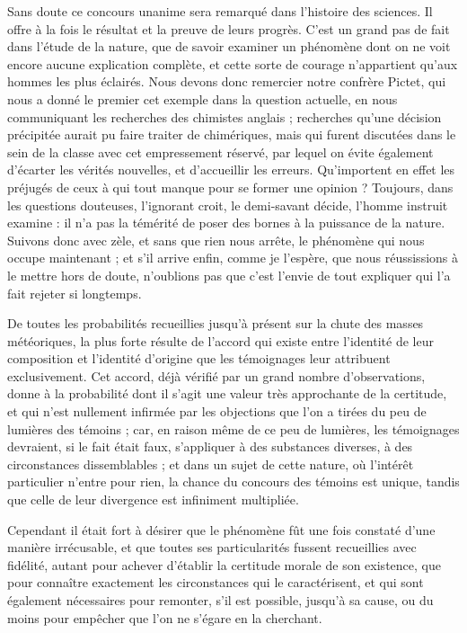 \documentclass[a4paper, 11pt, oneside, polutonikogreek, french]{article}
\begin{document}
Sans doute ce concours unanime sera remarqué dans l'histoire des sciences. Il offre à la fois le résultat et la preuve de leurs progrès. C'est un grand pas de fait dans l'étude de la nature, que de savoir examiner un phénomène dont on ne voit encore aucune explication complète, et cette sorte de courage n'appartient qu'aux hommes les plus éclairés. Nous devons donc remercier notre confrère Pictet, qui nous a donné le premier cet exemple dans la question actuelle, en nous communiquant les recherches des chimistes anglais ; recherches qu'une décision précipitée aurait pu faire traiter de chimériques, mais qui furent discutées dans le sein de la classe avec cet empressement réservé, par lequel on évite également d'écarter les vérités nouvelles, et d'accueillir les erreurs. Qu'importent en effet les préjugés de ceux à qui tout manque pour se former une opinion ? Toujours, dans les questions douteuses, l'ignorant croit, le demi-savant décide, l'homme instruit examine : il n'a pas la témérité de poser des bornes à la puissance de la nature. Suivons donc avec zèle, et sans que rien nous arrête, le phénomène qui nous occupe maintenant ; et s'il arrive enfin, comme je l'espère, que nous réussissions à le mettre hors de doute, n'oublions pas que c'est l'envie de tout expliquer qui l'a fait rejeter si longtemps.

De toutes les probabilités recueillies jusqu'à présent sur la chute des masses météoriques, la plus forte résulte de l'accord qui existe entre l'identité de leur composition et l'identité d'origine que les témoignages leur attribuent exclusivement. Cet accord, déjà vérifié par un grand nombre d'observations, donne à la probabilité dont il s'agit une valeur très approchante de la certitude, et qui n'est nullement infirmée par les objections que l'on a tirées du peu de lumières des témoins ; car, en raison même de ce peu de lumières, les témoignages devraient, si le fait était faux, s'appliquer à des substances diverses, à des circonstances dissemblables ; et dans un sujet de cette nature, où l'intérêt particulier n'entre pour rien, la chance du concours des témoins est unique, tandis que celle de leur divergence est infiniment multipliée.

Cependant il était fort à désirer que le phénomène fût une fois constaté d'une manière irrécusable, et que toutes ses particularités fussent recueillies avec fidélité, autant pour achever d'établir la certitude morale de son existence, que pour connaître exactement les circonstances qui le caractérisent, et qui sont également nécessaires pour remonter, s'il est possible, jusqu'à sa cause, ou du moins pour empêcher que l'on ne s'égare en la cherchant.
\end{document}
